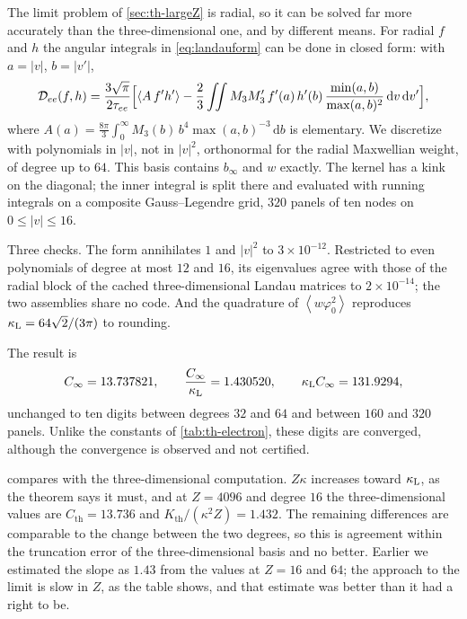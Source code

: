 \documentclass[11pt]{article}
\newcommand{\dd}{\,\mathrm d}
\newcommand{\av}[1]{\left\langle #1\right\rangle}
\newcommand{\D}{\mathcal D}
\newcommand{\kap}{\kappa}
\newcommand{\thr}{\mathrm{th}}
\theoremstyle{definition}
\theoremstyle{remark}
\numberwithin{equation}{section}
\begin{document}
The limit problem of \cref{sec:th-largeZ} is radial, so it can be solved
far more accurately than the three-dimensional one, and by different
means. For radial $f$ and $h$ the angular integrals in
\eqref{eq:landauform} can be done in closed form: with $a=|v|$, $b=|v'|$,
\[
 \D_{ee}(f,h)=\frac{3\sqrt\pi}{2\tau_{ee}}\Bigl[\av{A\,f'h'}
  -\frac23\iint M_3M_3'\,f'(a)\,h'(b)\,
     \frac{\min(a,b)}{\max(a,b)^2}\dd v\dd v'\Bigr],
\]
where $A(a)=\tfrac{8\pi}3\int_0^\infty M_3(b)\,b^4\max(a,b)^{-3}\dd b$ is
elementary. We discretize with polynomials in $|v|$, not in $|v|^2$,
orthonormal for the radial Maxwellian weight, of degree up to $64$. This
basis contains $b_\infty$ and $w$ exactly. The kernel has a kink on the
diagonal; the inner integral is split there and evaluated with running
integrals on a composite Gauss--Legendre grid, $320$ panels of ten nodes
on $0\leq|v|\leq16$.

Three checks. The form annihilates $1$ and $|v|^2$ to $3\times10^{-12}$.
Restricted to even polynomials of degree at most $12$ and $16$, its
eigenvalues agree with those of the radial block of the cached
three-dimensional Landau matrices to $2\times10^{-14}$; the two assemblies
share no code. And the quadrature of $\av{w\varphi_0^2}$ reproduces
$\kap_{\rm L}=64\sqrt2/(3\pi)$ to rounding.

The result is
\[
 C_\infty=13.737821,\qquad \frac{C_\infty}{\kap_{\rm L}}=1.430520,\qquad
 \kap_{\rm L}C_\infty=131.9294,
\]
unchanged to ten digits between degrees $32$ and $64$ and between $160$
and $320$ panels. Unlike the constants of \cref{tab:th-electron}, these
digits are converged, although the convergence is observed and not
certified.

\begin{table}[tb]
\centering
\caption{Approach to the large-charge limit of \cref{thm:largeZ} in the
three-dimensional Galerkin computation at degrees $12$ and $16$, in units
$\tau_{ee}=1$. The last row is the limit, computed with the radial
solver.}
\label{tab:th-largeZ}
\small

\end{table}

 compares with the three-dimensional computation.
$Z\kap$ increases toward $\kap_{\rm L}$, as the theorem says it must, and
at $Z=4096$ and degree $16$ the three-dimensional values are
$C_\thr=13.736$ and $K_\thr/(\kap^2Z)=1.432$. The remaining differences
are comparable to the change between the two degrees, so this is
agreement within the truncation error of the three-dimensional basis and
no better. Earlier we estimated the slope as $1.43$ from the values at
$Z=16$ and $64$; the approach to the limit is slow in $Z$, as the table
shows, and that estimate was better than it had a right to be.
\end{document}
